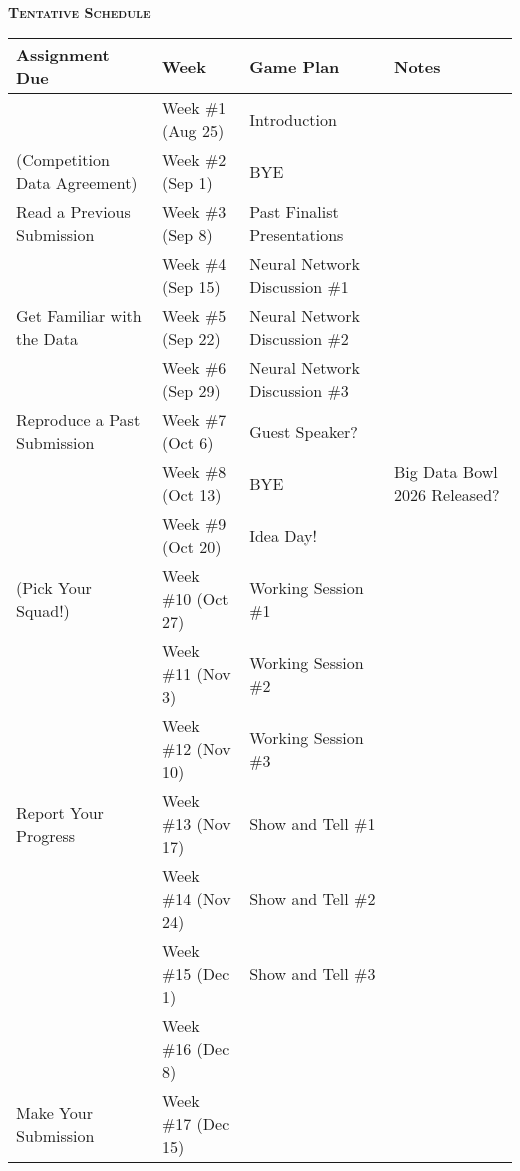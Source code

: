 \documentclass[11pt]{article}
\begin{document}
~\\
\textbf{\textsc{Tentative Schedule}}
\begin{center}
  \begin{tabular}{llll}
    Assignment Due                & Week                & Game Plan                   & Notes\\
    \hline
    \hline
                                  & Week \#1 (Aug 25)   & Introduction\\
    (Competition Data Agreement)  & Week \#2 (Sep 1)    & BYE\\
    Read a Previous Submission    & Week \#3 (Sep 8)    & Past Finalist Presentations\\
    \hline
                                  & Week \#4 (Sep 15)   & Neural Network Discussion \#1\\
    Get Familiar with the Data    & Week \#5 (Sep 22)   & Neural Network Discussion \#2\\
    \hline
                                  & Week \#6 (Sep 29)   & Neural Network Discussion \#3\\
    Reproduce a Past Submission   & Week \#7 (Oct 6)    & Guest Speaker?\\
    \hline
                                  & Week \#8 (Oct 13)   & BYE                         & Big Data Bowl 2026 Released?\\
                                  & Week \#9 (Oct 20)   & Idea Day!\\
    (Pick Your Squad!)            & Week \#10 (Oct 27)  & Working Session \#1\\
                                  & Week \#11 (Nov 3)   & Working Session \#2\\
                                  & Week \#12 (Nov 10)  & Working Session \#3\\
    Report Your Progress          & Week \#13 (Nov 17)  & Show and Tell \#1\\
                                  & Week \#14 (Nov 24)  & Show and Tell \#2\\
                                  & Week \#15 (Dec 1)   & Show and Tell \#3\\
    \hline
                                  & Week \#16 (Dec 8)   & \\
    Make Your Submission          & Week \#17 (Dec 15)  & \\
  \end{tabular}
\end{center}
\end{document}
